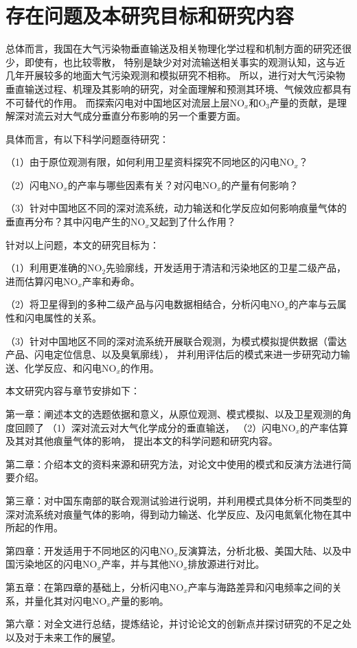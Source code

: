 \section{存在问题及本研究目标和研究内容}

总体而言，我国在大气污染物垂直输送及相关物理化学过程和机制方面的研究还很少，即使有，也比较零散，
特别是缺少对对流输送相关事实的观测认知，这与近几年开展较多的地面大气污染观测和模拟研究不相称。
所以，进行对大气污染物垂直输送过程、机理及其影响的研究，对全面理解和预测其环境、气候效应都具有不可替代的作用。
而探索闪电对中国地区对流层上层NO$_x$和O$_3$产量的贡献，是理解深对流云对大气成分垂直分布影响的另一个重要方面。

具体而言，有以下科学问题亟待研究：

（1）由于原位观测有限，如何利用卫星资料探究不同地区的闪电NO$_x$？

（2）闪电NO$_x$的产率与哪些因素有关？对闪电NO$_x$的产量有何影响？

（3）针对中国地区不同的深对流系统，动力输送和化学反应如何影响痕量气体的垂直再分布？其中闪电产生的NO$_x$又起到了什么作用？

针对以上问题，本文的研究目标为：

（1）利用更准确的NO$_2$先验廓线，开发适用于清洁和污染地区的卫星二级产品，进而估算闪电NO$_x$产率和寿命。

（2）将卫星得到的多种二级产品与闪电数据相结合，分析闪电NO$_x$的产率与云属性和闪电属性的关系。

（3）针对中国地区不同的深对流系统开展联合观测，为模式模拟提供数据（雷达产品、闪电定位信息、以及臭氧廓线），
并利用评估后的模式来进一步研究动力输送、化学反应、和闪电NO$_x$的作用。

本文研究内容与章节安排如下：

第一章：阐述本文的选题依据和意义，从原位观测、模式模拟、以及卫星观测的角度回顾了
（1）深对流云对大气化学成分的垂直输送，
（2）闪电NO$_x$的产率估算及其对其他痕量气体的影响，
提出本文的科学问题和研究内容。

第二章：介绍本文的资料来源和研究方法，对论文中使用的模式和反演方法进行简要介绍。

第三章：对中国东南部的联合观测试验进行说明，并利用模式具体分析不同类型的深对流系统对痕量气体的影响，得到动力输送、化学反应、及闪电氮氧化物在其中所起的作用。

第四章：开发适用于不同地区的闪电NO$_x$反演算法，分析北极、美国大陆、以及中国污染地区的闪电NO$_x$产率，并与其他NO$_x$排放源进行对比。

第五章：在第四章的基础上，分析闪电NO$_x$产率与海路差异和闪电频率之间的关系，并量化其对闪电NO$_x$产量的影响。

第六章：对全文进行总结，提炼结论，并讨论论文的创新点并探讨研究的不足之处以及对于未来工作的展望。
